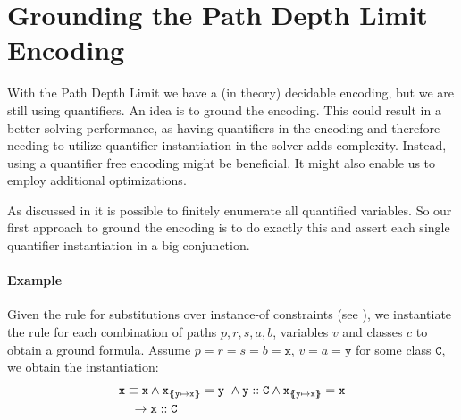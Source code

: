 \documentclass[a4paper]{article}
\begin{document}
\section{Grounding the Path Depth Limit Encoding}
With the Path Depth Limit we have a (in theory) decidable encoding,
but we are still using quantifiers.
An idea is to ground the encoding.
This could result in a better solving performance,
as having quantifiers in the encoding
and therefore needing to utilize quantifier instantiation
in the solver adds complexity.
Instead, using a quantifier free encoding might be beneficial.
It might also enable us to employ additional optimizations.

As discussed in  it is possible
to finitely enumerate all quantified variables.
So our first approach to ground the encoding is to do exactly this
and assert each single quantifier instantiation in a big conjunction.

\paragraph{Example}
\label{ex:smt-ground-instantiation}
Given the rule for substitutions over instance-of constraints
(see ),
we instantiate the rule for each combination of paths $p,r,s,a,b$,
variables $v$ and classes $c$ to obtain a ground formula.
Assume $p=r=s=b=\mathtt{x}$, $v=a=\mathtt{y}$ for some class $\mathtt{C}$,
we obtain the instantiation:
%
\begin{align*}
  &\mathit{\mathtt{x}} \equiv \mathit{\mathtt{x}} \land \mathtt{x}_{\{\mskip-6.9mu\{ \mathtt{y} \mapsto \mathtt{x} \}\mskip-6.9mu\}}=\mathtt{y}~\land
  \mathit{\mathtt{y}} :: \mathit{\mathtt{C}} \land \mathtt{x}_{\{\mskip-6.9mu\{ \mathtt{y} \mapsto \mathtt{x} \}\mskip-6.9mu\}}=\mathtt{x}\\
  &\quad \rightarrow \mathit{\mathtt{x}} :: \mathit{\mathtt{C}}
\end{align*}
\end{document}
